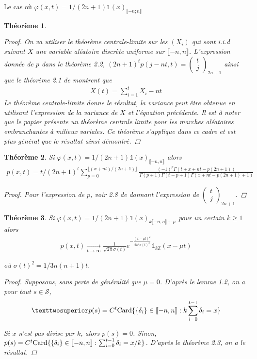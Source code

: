 \documentclass{article}
\newtheorem{theorem}{Théorème}[section]
\theoremstyle{definition}
\begin{document}
\begin{section}{Le cas où $\varphi(x, t) = 1/(2n+1)\mathds{1}(x)_{\llbracket -n; n\rrbracket}$}
\begin{theorem}
\begin{proof}
	On va utiliser le théorème centrale-limite sur les $(X_i)$ qui sont i.i.d suivant $X$ une variable aléatoire discrète uniforme sur $\llbracket -n,n\rrbracket$. L'expression donnée de $p$ dans le théorème 2.2, $(2n+1)^tp(j-nt,t) = \begin{pmatrix} t\\j\end{pmatrix}_{2n+1}$ ainsi que le théorème 2.1 de \cite{h2} montrent que 
	\begin{align*}
		X(t) = \sum_{i=1}^t X_i - n t
	\end{align*}
	Le théorème centrale-limite donne le résultat, la variance peut être obtenue en utilisant l'expression de la variance de $X$ et l'équation précédente. Il est à noter que le papier \cite{10.2307/1426526} présente un théorème centrale limite pour les marches aléatoires embranchantes à milieux variales. Ce théorème s'applique dans ce cadre et est plus général que le résultat ainsi démontré.
\end{proof}
	
\end{theorem}
\begin{theorem}
	Si $\varphi(x,t) =1/(2n+1) \mathds{1}(x)_{\llbracket -n,n\rrbracket}$ alors
	\begin{align*}
		p(x,t) = t/(2n+1)^t\sum_{p=0}^{\lfloor (x+nt)/(2n+1)\rfloor} \frac{(-1)^p\Gamma(t+x+nt-p(2n+1))}{\Gamma(p+1)\Gamma(t-p+1)\Gamma(x+nt-p(2n+1)+1)}
	\end{align*}
	\begin{proof}
		Pour l'expression de $p$, voir 2.8 de \cite{h2} donnant l'expression de $\begin{pmatrix} t\\j\end{pmatrix}_{2n+1}$. 
	\end{proof}
\end{theorem}
\begin{theorem}
	Si $\varphi(x,t) = 1/(2n+1)\mathds{1}(x)_{k\llbracket -n,n\rrbracket+\mu}$ pour un certain $k\geq 1$ alors
	\begin{align*}
		p(x,t) \underset{t\to \infty}{\to} \frac{1}{\sqrt{2\pi}\sigma(t)} e^{-\frac{(x-\mu t)^2}{2k^2\sigma(t)^2}}\mathds{1}_{k\mathbb{Z}}(x-\mu t) 
	\end{align*}

	où $\sigma(t)^2 = 1/3n(n+1)t$.
	\begin{proof}
		Supposons, sans perte de généralité que $\mu = 0$. D'après le lemme 1.2, on a pour tout $s\in \mathcal{S}$, 
		\begin{align*}
		²p(s) = C^t\textup{Card}\{\{\delta_i\} \in \llbracket -n,n\rrbracket : k\sum_{i=0}^{t-1}\delta_i = x\}
		\end{align*}

		Si $x$ n'est pas divise par $k$, alors $p(s) = 0$. Sinon, $p(s) = C^t\textup{Card}\{\{\delta_i\}\in\llbracket -n,n\rrbracket : \sum_{i=0}^{t-1}\delta_i = x/k\}$. D'après le théorème 2.3, on a le résultat.
	\end{proof}
\end{theorem}
\end{section}
\end{document}
